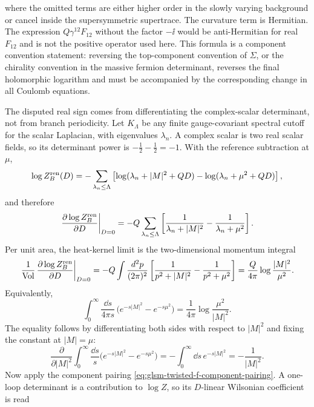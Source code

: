 where the omitted terms are either higher order in the slowly varying
background or cancel inside the supersymmetric supertrace.  The curvature
term is Hermitian.  The expression \(Q\gamma^{12}F_{12}\) without the factor
\(-\ii\) would be anti-Hermitian for real \(F_{12}\) and is not the positive
operator used here.  This formula is a component convention statement:
reversing the top-component convention of \(\Sigma\), or the chirality
convention in the massive fermion determinant, reverses the final holomorphic
logarithm and must be accompanied by the corresponding change in all Coulomb
equations.

The disputed real sign comes from differentiating the complex-scalar
determinant, not from branch periodicity.  Let \(K_\Lambda\) be any finite
gauge-covariant spectral cutoff for the scalar Laplacian, with eigenvalues
\(\lambda_n\).  A complex scalar is two real scalar fields, so its determinant
power is \(-\frac12-\frac12=-1\).  With the reference subtraction at \(\mu\),
\[
  \log Z_B^{\rm ren}(D)
  =
  -\sum_{\lambda_n\le\Lambda}
  \left[
  \log(\lambda_n+|M|^2+QD)
  -
  \log(\lambda_n+\mu^2+QD)
  \right],
\]
and therefore
\[
  \left.
  \frac{\partial\log Z_B^{\rm ren}}{\partial D}
  \right|_{D=0}
  =
  -Q\sum_{\lambda_n\le\Lambda}
  \left[
  \frac1{\lambda_n+|M|^2}
  -
  \frac1{\lambda_n+\mu^2}
  \right].
\]
Per unit area, the heat-kernel limit is the two-dimensional momentum integral
\begin{equation}
  \left.
  \frac1{{\rm Vol}}\,
  \frac{\partial\log Z_B^{\rm ren}}{\partial D}
  \right|_{D=0}
  =
  -Q\int\frac{d^2p}{(2\pi)^2}
  \left[
    \frac1{p^2+|M|^2}
    -
    \frac1{p^2+\mu^2}
  \right]
  =
  \frac{Q}{4\pi}\log\frac{|M|^2}{\mu^2}.
  \label{eq:abelian-glsm-determinant-local-density}
\end{equation}
Equivalently,
\begin{equation}
  \int_0^\infty
  \frac{\dd s}{4\pi s}\,
  \bigl(e^{-s|M|^2}-e^{-s\mu^2}\bigr)
  =
  \frac1{4\pi}\log\frac{\mu^2}{|M|^2}.
  \label{eq:abelian-glsm-proper-time-log}
\end{equation}
The equality follows by differentiating both sides with respect to
\(|M|^2\) and fixing the constant at \(|M|=\mu\):
\[
  \frac{\partial}{\partial |M|^2}
  \int_0^\infty\frac{\dd s}{s}
  \bigl(e^{-s|M|^2}-e^{-s\mu^2}\bigr)
  =
  -\int_0^\infty \dd s\,e^{-s|M|^2}
  =
  -\frac1{|M|^2}.
\]
Now apply the component pairing
\eqref{eq:glsm-twisted-f-component-pairing}.  A one-loop determinant is a
contribution to \(\log Z\), so its \(D\)-linear Wilsonian coefficient is read
